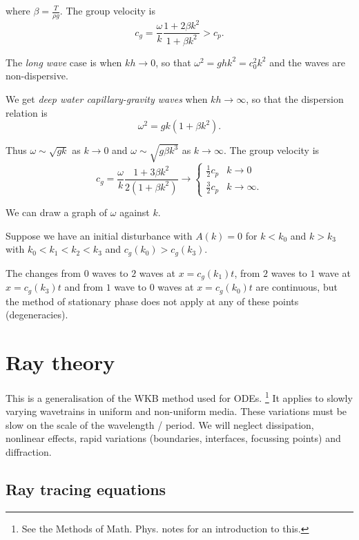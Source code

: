 \documentclass{notes}
\begin{document}
where $\beta = \tfrac{T}{\rho g}$.  The group velocity is
\[
c_g = \frac{\omega}{k} \frac{ 1 + 2 \beta k^2}{1 + \beta k^2} > c_p.
\]

The \emph{long wave} case is when $kh \to 0$, so that
$\omega^2 = g h k^2 = c_0^2 k^2$ and the waves are non-dispersive.

We get \emph{deep water capillary-gravity waves} when $k h \to \infty$,
so that the dispersion relation is
\[
\omega^2 = gk \left( 1+ \beta k^2 \right).
\] 

Thus $\omega \sim \sqrt{gk}$ as $k \to 0$ and $\omega \sim \sqrt{g
  \beta k^3}$ as $k \to \infty$.  The group velocity is
\[
c_g = \frac{\omega}{k} \frac{1 + 3 \beta k^2}{2(1+ \beta k^2)}
\to \begin{cases}
\frac{1}{2} c_p & k \to 0 \\
\frac{3}{2} c_p & k \to \infty.
\end{cases}
\]

We can draw a graph of $\omega$ against $k$.

\vspace{2in}

Suppose we have an initial disturbance with
$A(k) = 0$ for $k < k_0$ and $k > k_3$ with
$k_0 < k_1 < k_2 < k_3$ and $c_g(k_0) > c_g(k_3)$.

\vspace{1.5in}

The changes from $0$ waves to $2$ waves at $x= c_g(k_1)t$, from
$2$ waves to $1$ wave at $x = c_g(k_3) t$ and from $1$ wave to $0$
waves at $x = c_g(k_0) t$ are continuous, but the method of stationary
phase does not apply at any of these points (degeneracies).

\chapter{Ray theory}

This is a generalisation of the WKB method used for ODEs.%
\footnote{See the Methods of Math. Phys. notes for an introduction to
  this.}  It applies to slowly varying wavetrains in uniform and
non-uniform media.  These variations must be slow on the scale of the
wavelength / period.  We will neglect dissipation, nonlinear effects,
rapid variations (boundaries, interfaces, focussing points) and
diffraction.

\section{Ray tracing equations}
\end{document}
